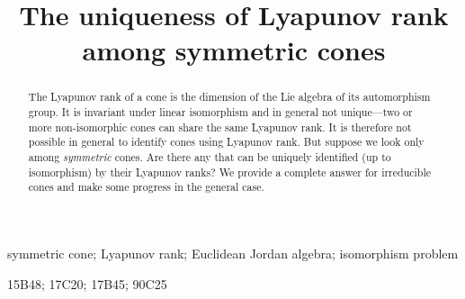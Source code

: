 \documentclass{interact}
\theoremstyle{plain}
\theoremstyle{definition}
\theoremstyle{remark}
\begin{document}
  \title{
    The uniqueness of Lyapunov rank among symmetric cones
  }
  \author{
  }

  \maketitle

  \begin{abstract}
    The Lyapunov rank of a cone is the dimension of the Lie algebra of
    its automorphism group. It is invariant under linear isomorphism
    and in general not unique---two or more non-isomorphic cones can
    share the same Lyapunov rank. It is therefore not possible in
    general to identify cones using Lyapunov rank. But suppose we look
    only among \emph{symmetric} cones. Are there any that can be
    uniquely identified (up to isomorphism) by their Lyapunov ranks?
    We provide a complete answer for irreducible cones and make some
    progress in the general case.
  \end{abstract}

  \begin{keywords}
    symmetric cone;
    Lyapunov rank;
    Euclidean Jordan algebra;
    isomorphism problem
  \end{keywords}

  \begin{amscode}
    15B48; %
    17C20; %
    17B45; %
    90C25  %
  \end{amscode}
\end{document}
